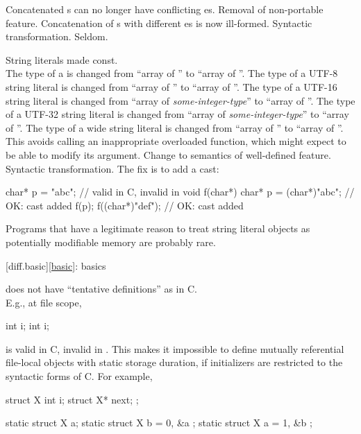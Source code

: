 \change
Concatenated s can no longer have
conflicting es.
\rationale
Removal of non-portable feature.
\effect
Concatenation of s
with different es
is now ill-formed.
\difficulty
Syntactic transformation.
\howwide
Seldom.

\change
String literals made const.\\
The type of a  is changed
from ``array of ''
to ``array of ''.
The type of a UTF-8 string literal is changed
from ``array of ''
to ``array of ''.
The type of a UTF-16 string literal is changed
from ``array of \textit{some-integer-type}''
to ``array of ''.
The type of a UTF-32 string literal is changed
from ``array of \textit{some-integer-type}''
to ``array of ''.
The type of a wide string literal is changed
from ``array of ''
to ``array of ''.
\rationale
This avoids calling an inappropriate overloaded function,
which might expect to be able to modify its argument.
\effect
Change to semantics of well-defined feature.
\difficulty
Syntactic transformation. The fix is to add a cast:
\begin{codeblock}
char* p = "abc";                // valid in C, invalid in \Cpp{}
void f(char*) {
  char* p = (char*)"abc";       // OK: cast added
  f(p);
  f((char*)"def");              // OK: cast added
}
\end{codeblock}

\howwide
Programs that have a legitimate reason to treat string literal objects
as potentially modifiable memory are probably rare.

[diff.basic]{\ref{basic}: basics}

\change
\Cpp{} does not have ``tentative definitions'' as in C.\\
E.g., at file scope,
\begin{codeblock}
int i;
int i;
\end{codeblock}
is valid in C, invalid in \Cpp{}.
This makes it impossible to define
mutually referential file-local objects with static storage duration,
if initializers are restricted to the syntactic forms of C\@.
For example,
\begin{codeblock}
struct X { int i; struct X* next; };

static struct X a;
static struct X b = { 0, &a };
static struct X a = { 1, &b };
\end{codeblock}


